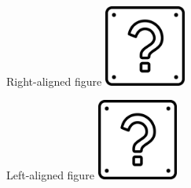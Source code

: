 \documentclass{beamer}
\begin{document}
\begin{frame}{Right-aligned figure}
  \hfill
  \includegraphics[width=0.2\textwidth]{Ques.png}
\end{frame}

\begin{frame}{Left-aligned figure}
  \includegraphics[width=0.2\textwidth]{Ques.png}
  \hfill
\end{frame}
\end{document}

